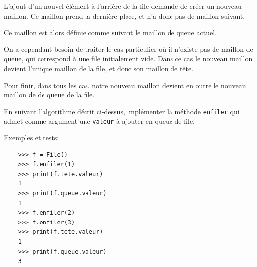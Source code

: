 \documentclass[a4paper,17pt]{extarticle}
\begin{document}
    L'ajout d'un nouvel élément à l'arrière de la file demande de créer un
nouveau maillon. Ce maillon prend la dernière place, et n'a donc pas de
maillon suivant.

Ce maillon est alors définie comme suivant le maillon de queue actuel.

On a cependant besoin de traiter le cas particulier où il n'existe pas
de maillon de queue, qui correspond à une file initialement vide. Dans
ce cas le nouveau maillon devient l'unique maillon de la file, et donc
son maillon de tête.

Pour finir, dans tous les cas, notre nouveau maillon devient en outre le
nouveau maillon de de queue de la file.

    En suivant l'algorithme décrit ci-dessus, implémenter la méthode
\texttt{enfiler} qui admet comme argument une \texttt{valeur} à ajouter
en queue de file.

Exemples et tests:

\begin{verbatim}
    >>> f = File()
    >>> f.enfiler(1)
    >>> print(f.tete.valeur)
    1
    >>> print(f.queue.valeur)
    1
    >>> f.enfiler(2)
    >>> f.enfiler(3)
    >>> print(f.tete.valeur)
    1
    >>> print(f.queue.valeur)
    3
\end{verbatim}
\end{document}
